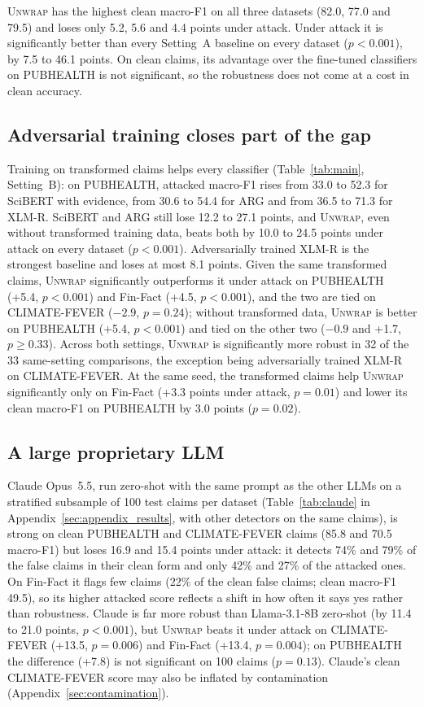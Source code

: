 \documentclass[11pt]{article}
\newcommand{\method}{\textsc{Unwrap}}
\begin{document}
\method{} has the highest clean macro-F1 on all three datasets (82.0, 77.0 and 79.5) and loses only 5.2, 5.6 and 4.4 points under attack. Under attack it is significantly better than every Setting~A baseline on every dataset ($p<0.001$), by 7.5 to 46.1 points. On clean claims, its advantage over the fine-tuned classifiers on PUBHEALTH is not significant, so the robustness does not come at a cost in clean accuracy.

\subsection{Adversarial training closes part of the gap}

Training on transformed claims helps every classifier (Table~\ref{tab:main}, Setting~B): on PUBHEALTH, attacked macro-F1 rises from 33.0 to 52.3 for SciBERT with evidence, from 30.6 to 54.4 for ARG and from 36.5 to 71.3 for XLM-R. SciBERT and ARG still lose 12.2 to 27.1 points, and \method{}, even without transformed training data, beats both by 10.0 to 24.5 points under attack on every dataset ($p<0.001$). Adversarially trained XLM-R is the strongest baseline and loses at most 8.1 points. Given the same transformed claims, \method{} significantly outperforms it under attack on PUBHEALTH (+5.4, $p<0.001$) and Fin-Fact (+4.5, $p<0.001$), and the two are tied on CLIMATE-FEVER ($-2.9$, $p=0.24$); without transformed data, \method{} is better on PUBHEALTH (+5.4, $p<0.001$) and tied on the other two ($-0.9$ and +1.7, $p\ge0.33$). Across both settings, \method{} is significantly more robust in 32 of the 33 same-setting comparisons, the exception being adversarially trained XLM-R on CLIMATE-FEVER. At the same seed, the transformed claims help \method{} significantly only on Fin-Fact (+3.3 points under attack, $p=0.01$) and lower its clean macro-F1 on PUBHEALTH by 3.0 points ($p=0.02$).

\subsection{A large proprietary LLM}

Claude Opus~5.5, run zero-shot with the same prompt as the other LLMs on a stratified subsample of 100 test claims per dataset (Table~\ref{tab:claude} in Appendix~\ref{sec:appendix_results}, with other detectors on the same claims), is strong on clean PUBHEALTH and CLIMATE-FEVER claims (85.8 and 70.5 macro-F1) but loses 16.9 and 15.4 points under attack: it detects 74\% and 79\% of the false claims in their clean form and only 42\% and 27\% of the attacked ones. On Fin-Fact it flags few claims (22\% of the clean false claims; clean macro-F1 49.5), so its higher attacked score reflects a shift in how often it says yes rather than robustness. Claude is far more robust than Llama-3.1-8B zero-shot (by 11.4 to 21.0 points, $p<0.001$), but \method{} beats it under attack on CLIMATE-FEVER (+13.5, $p=0.006$) and Fin-Fact (+13.4, $p=0.004$); on PUBHEALTH the difference (+7.8) is not significant on 100 claims ($p=0.13$). Claude's clean CLIMATE-FEVER score may also be inflated by contamination (Appendix~\ref{sec:contamination}).
\end{document}
